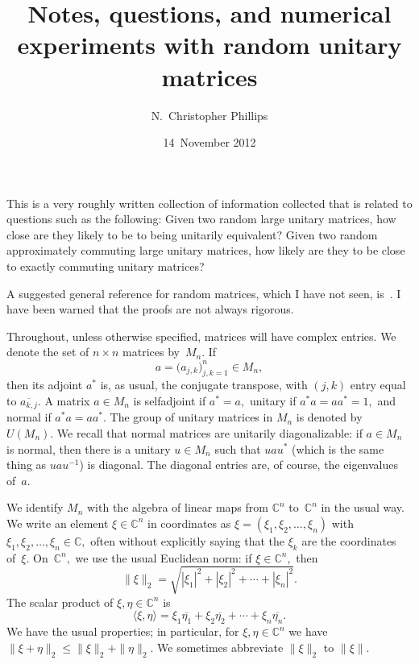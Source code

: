 \documentclass[10pt]{amsart}
\title[Random unitary matrices]{Notes,
questions, and numerical experiments with
random unitary matrices}
\author{N.~Christopher Phillips}
\date{14~November 2012}
\theoremstyle{definition}
\newcommand{\et}{\eta}
\newcommand{\C}{{\mathbb{C}}}
\begin{document}
\maketitle

This is a very roughly written collection of information
collected that is related to questions such as the following:
Given two random large unitary matrices,
how close are they likely to be to being unitarily equivalent?
Given two random approximately commuting large unitary matrices,
how likely are they to be close to exactly commuting unitary matrices?

A suggested general reference for random matrices,
which I have not seen, is~\cite{Mh}.
I have been warned that the proofs are not always rigorous.

Throughout, unless otherwise specified,
matrices will have complex entries.
We denote the set of $n \times n$ matrices by~$M_n.$
If
\[
a = \big( a_{j, k} \big)_{j, k = 1}^n \in M_n,
\]
then its adjoint $a^*$ is, as usual, the conjugate transpose,
with $(j, k)$ entry equal to ${\overline{a_{k, j}}}.$
A matrix $a \in M_n$ is selfadjoint if $a^* = a,$
unitary if $a^* a = a a^* = 1,$
and normal if $a^* a = a a^*.$
The group of unitary matrices in $M_n$ is denoted by $U (M_n).$
We recall that normal matrices are unitarily diagonalizable:
if $a \in M_n$ is normal, then there is a unitary $u \in M_n$
such that $u a u^*$ (which is the same thing as $u a u^{-1}$)
is diagonal.
The diagonal entries are, of course, the eigenvalues of~$a.$

We identify $M_n$ with the algebra of linear maps from $\C^n$ to~$\C^n$
in the usual way.
We write an element $\xi \in \C^n$
in coordinates as $\xi = (\xi_1, \xi_2, \ldots, \xi_n)$
with $\xi_1, \xi_2, \ldots, \xi_n \in \C,$
often without explicitly saying that the $\xi_k$ are the coordinates
of~$\xi.$
On~$\C^n,$ we use the usual Euclidean norm:
if $\xi \in \C^n,$
then
\[
\| \xi \|_2 = \sqrt{ | \xi_1 |^2 + | \xi_2 |^2 + \cdots + | \xi_n |^2}.
\]
The scalar product of $\xi, \et \in \C^n$ is
\[
\langle \xi, \et \rangle
  = \xi_1 {\overline{\et_1}}
      + \xi_2 {\overline{\et_2}}
      + \cdots + \xi_n {\overline{\et_n}}.
\]
We have the usual properties; in particular, for $\xi, \et \in \C^n$
we have $\| \xi + \et \|_2 \leq \| \xi \|_2 + \| \et \|_2.$
We sometimes abbreviate $\| \xi \|_2$ to $\| \xi \|.$
\end{document}
